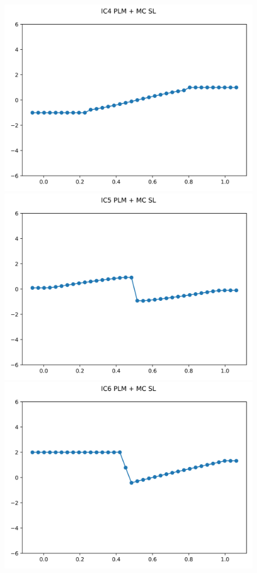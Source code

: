 \documentclass{article}
\begin{document}
\begin{figure}[t]
        \includegraphics[width=.95\textwidth]{../../code/unsafe_IC4Methodpo_plot.png}
        \includegraphics[width=.95\textwidth]{../../code/unsafe_IC5Methodpo_plot.png}
        \includegraphics[width=.95\textwidth]{../../code/unsafe_IC6Methodpo_plot.png}

\end{figure}
\end{document}
